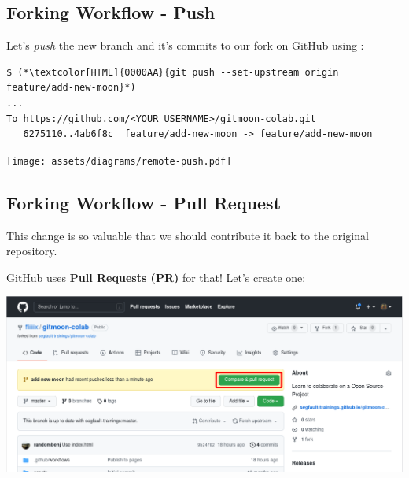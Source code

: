 \subsection{Forking Workflow - Push}
\begin{frame}[fragile]
  \subslidetitle

  Let's \textit{push} the new branch and it's commits to our fork on GitHub using :

  \begin{lstlisting}
$ (*\textcolor[HTML]{0000AA}{git push --set-upstream origin feature/add-new-moon}*)
...
To https://github.com/<YOUR USERNAME>/gitmoon-colab.git
   6275110..4ab6f8c  feature/add-new-moon -> feature/add-new-moon
\end{lstlisting}

  \centerline{\texttt{[image: assets/diagrams/remote-push.pdf]}}

\end{frame}

\subsection{Forking Workflow - Pull Request}
\begin{frame}[fragile]
  \subslidetitle

  This change is so valuable that we should contribute it back to the original repository.

  \vspace{1em}
    GitHub uses \textbf{Pull Requests (PR)} for that! Let's create one:

  \vspace{1em}
  \centerline{\includegraphics[width=\textwidth]{../assets/images/github-pull-request-create.png}}

\end{frame}

